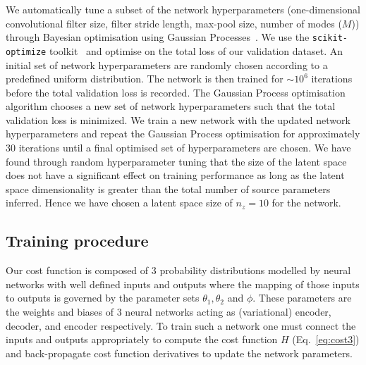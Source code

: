 \documentclass[%
showpacs,
nofootinbib,
 amsmath,amssymb,
 aps,
 twocolumn,
 prl,
 reprint,
floatfix,
]{revtex4-1}
\begin{document}
%
%
We automatically tune a subset of the network hyperparameters
(one-dimensional convolutional filter size, filter stride length, max-pool size, number of
modes ($M$)) through Bayesian optimisation using Gaussian
Processes~\cite{Siria2020.06.11.144253}. We use the \texttt{scikit-optimize}
toolkit~\cite{scikit-learn} and optimise on the total loss of our validation
dataset. An initial set of network hyperparameters are randomly chosen
according to a predefined uniform distribution. The network is then trained for
$\sim 10^6$ iterations before the total validation loss is recorded. The
Gaussian Process optimisation algorithm chooses a new set of network
hyperparameters such that the total validation loss is minimized. We train a
new network with the updated network hyperparameters and repeat the Gaussian
Process optimisation for approximately 30 iterations until a final optimised
set of hyperparameters are chosen. We have found through random hyperparameter
tuning that the size of the latent space does not have a significant effect on
training performance as long as the latent space dimensionality is greater than
the total number of source parameters inferred.  Hence we have chosen a latent
space size of $n_z=10$ for the network.

\subsection{Training procedure}\label{app:training_procedure}
%
%
Our cost function is composed of 3 probability distributions modelled by
neural networks with well defined inputs and outputs where the mapping of
those inputs to outputs is governed by the parameter sets
$\theta_{1},\theta_{2}$ and $\phi$. These parameters are the weights and biases
of 3 neural networks acting as (variational) encoder, decoder, and encoder
respectively. To train such a network one must connect the inputs and outputs
appropriately to compute the cost function $H$ (Eq.~\ref{eq:cost3}) and
back-propagate cost function derivatives to update the network parameters. 
\end{document}
